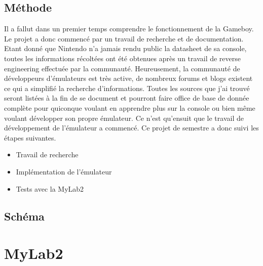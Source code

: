 \documentclass[a4paper]{article}
\begin{document}

\subsection{Méthode}
Il a fallut dans un premier temps comprendre le fonctionnement de la Gameboy. 
Le projet a donc commencé par un travail de recherche et de documentation. Etant 
donné que Nintendo n'a jamais rendu public la datasheet de sa console, toutes les 
informations récoltées ont été obtenues après un travail de reverse engineering 
effectuée par la communauté. Heureusement, la communauté de développeurs d'émulateurs 
est très active, de nombreux forums et blogs existent ce qui a simplifié la recherche
d'informations. Toutes les sources que j'ai trouvé seront listées à la fin de se 
document et pourront faire office de base de donnée complète pour quiconque voulant 
en apprendre plus sur la console ou bien même voulant développer son propre émulateur.
Ce n'est qu'ensuit que le travail de développement de l'émulateur a commencé. Ce
projet de semestre a donc suivi les étapes suivantes.
\begin{itemize}[label=\textbullet]
	\item Travail de recherche
	\item Implémentation de l'émulateur
	\item Tests avec la MyLab2
\end{itemize}


\subsection{Schéma}

\newpage

\section{MyLab2}
\end{document}
